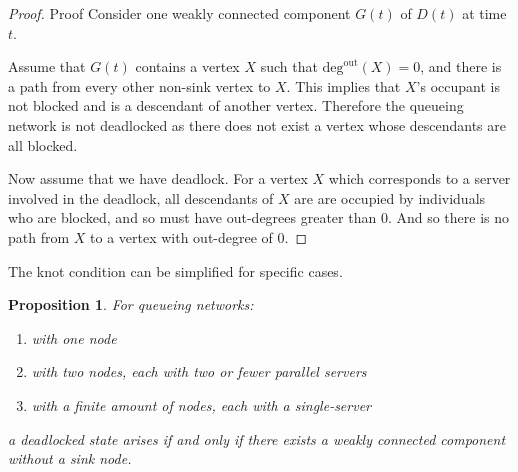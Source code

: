 \documentclass{article}
\newtheorem{proposition}{Proposition}
\numberwithin{equation}{section}
\begin{document}
\begin{proof}{Proof}
Consider one weakly connected component $G(t)$ of $D(t)$ at time $t$.

Assume that $G(t)$ contains a vertex $X$ such that
$\text{deg}^{\text{out}}(X) = 0$, and there is a path from every other
non-sink vertex to $X$.
This implies that $X$'s occupant is not blocked and is a descendant of another
vertex.
Therefore the queueing network is not deadlocked as there does not exist a
vertex whose descendants are all blocked.

Now assume that we have deadlock.
For a vertex $X$ which corresponds to a server involved in the deadlock, all
descendants of $X$ are are occupied by individuals who are blocked, and so
must have out-degrees greater than 0.
And so there is no path from $X$ to a vertex with out-degree of 0.

\end{proof}

The knot condition can be simplified for specific cases.

\begin{proposition}
For queueing networks:
\begin{enumerate}
  \item with one node
  \item with two nodes, each with two or fewer parallel servers
  \item with a finite amount of nodes, each with a single-server
\end{enumerate}
a deadlocked state arises if and only if there exists a weakly connected
component without a sink node.
\end{proposition}
\end{document}
